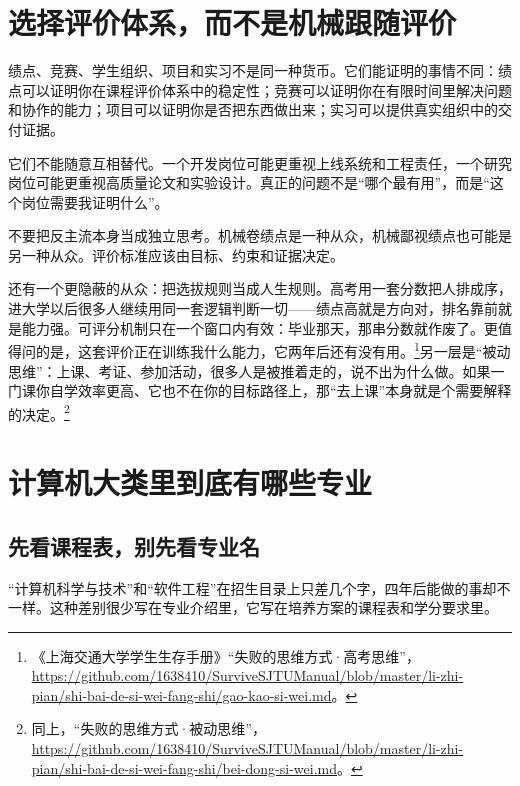 \documentclass[UTF8,zihao=5,openany]{ctexbook}
\newcommand{\fillrule}{\leavevmode\leaders\hbox{\rule[-0.15em]{2pt}{0.4pt}}\hfill\kern0pt}
\begin{document}

\section{选择评价体系，而不是机械跟随评价}
绩点、竞赛、学生组织、项目和实习不是同一种货币。它们能证明的事情不同：绩点可以证明你在课程评价体系中的稳定性；竞赛可以证明你在有限时间里解决问题和协作的能力；项目可以证明你是否把东西做出来；实习可以提供真实组织中的交付证据。

它们不能随意互相替代。一个开发岗位可能更重视上线系统和工程责任，一个研究岗位可能更重视高质量论文和实验设计。真正的问题不是“哪个最有用”，而是“这个岗位需要我证明什么”。

\begin{warningbox}
不要把反主流本身当成独立思考。机械卷绩点是一种从众，机械鄙视绩点也可能是另一种从众。评价标准应该由目标、约束和证据决定。
\end{warningbox}


还有一个更隐蔽的从众：把选拔规则当成人生规则。高考用一套分数把人排成序，进大学以后很多人继续用同一套逻辑判断一切——绩点高就是方向对，排名靠前就是能力强。可评分机制只在一个窗口内有效：毕业那天，那串分数就作废了。更值得问的是，这套评价正在训练我什么能力，它两年后还有没有用。\footnote{《上海交通大学学生生存手册》“失败的思维方式·高考思维”，\url{https://github.com/1638410/SurviveSJTUManual/blob/master/li-zhi-pian/shi-bai-de-si-wei-fang-shi/gao-kao-si-wei.md}。}另一层是“被动思维”：上课、考证、参加活动，很多人是被推着走的，说不出为什么做。如果一门课你自学效率更高、它也不在你的目标路径上，那“去上课”本身就是个需要解释的决定。\footnote{同上，“失败的思维方式·被动思维”，\url{https://github.com/1638410/SurviveSJTUManual/blob/master/li-zhi-pian/shi-bai-de-si-wei-fang-shi/bei-dong-si-wei.md}。}

\section{计算机大类里到底有哪些专业}

\subsection{先看课程表，别先看专业名}
“计算机科学与技术”和“软件工程”在招生目录上只差几个字，四年后能做的事却不一样。这种差别很少写在专业介绍里，它写在培养方案的课程表和学分要求里。
\end{document}
